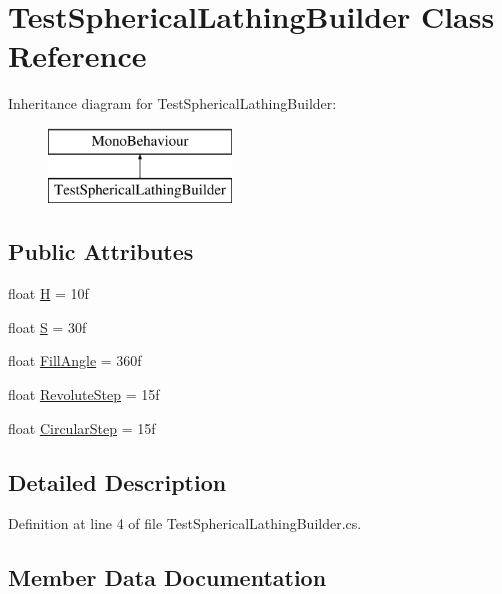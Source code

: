 \hypertarget{class_test_spherical_lathing_builder}{}\section{Test\+Spherical\+Lathing\+Builder Class Reference}
\label{class_test_spherical_lathing_builder}
Inheritance diagram for Test\+Spherical\+Lathing\+Builder\+:\begin{figure}[H]
\begin{center}
\leavevmode
\includegraphics[height=2.000000cm]{class_test_spherical_lathing_builder}
\end{center}
\end{figure}
\subsection*{Public Attributes}
\begin{DoxyCompactItemize}
\item 
float \mbox{\hyperlink{class_test_spherical_lathing_builder_a6553ab885937fc1376be0d8e0e495d97}{H}} = 10f
\item 
float \mbox{\hyperlink{class_test_spherical_lathing_builder_aa81e26148cebdd81ba7067d292ffacbd}{S}} = 30f
\item 
float \mbox{\hyperlink{class_test_spherical_lathing_builder_a977f0ccf34432c1ab9c21b909ed9f3c9}{Fill\+Angle}} = 360f
\item 
float \mbox{\hyperlink{class_test_spherical_lathing_builder_a7a9ebb9b908c19519ccab9c82afa18d0}{Revolute\+Step}} = 15f
\item 
float \mbox{\hyperlink{class_test_spherical_lathing_builder_a76d43d5f7e35d185be8d183321b43d25}{Circular\+Step}} = 15f
\end{DoxyCompactItemize}


\subsection{Detailed Description}


Definition at line 4 of file Test\+Spherical\+Lathing\+Builder.\+cs.



\subsection{Member Data Documentation}
\mbox{\label{class_test_spherical_lathing_builder_a76d43d5f7e35d185be8d183321b43d25}} 
